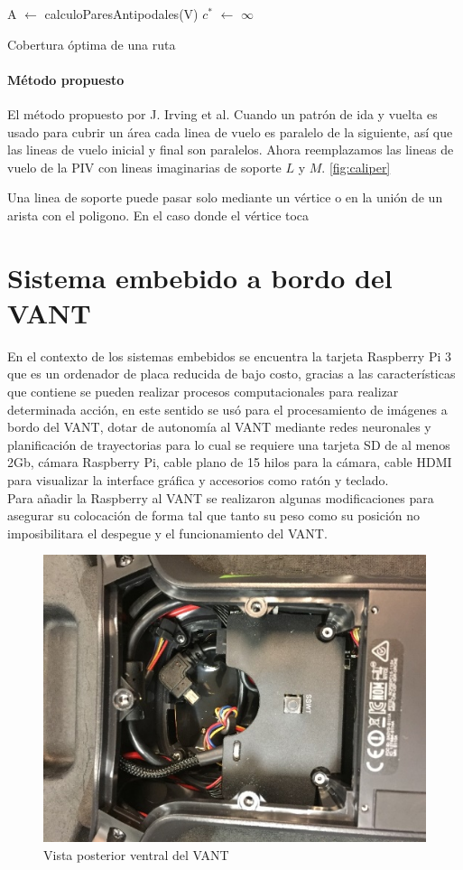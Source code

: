 \documentclass[]{report}
\begin{document}
\begin{algorithm}[H]
	\SetAlgoLined
	\KwResult{$\tau$}
	A $\longleftarrow$ calculoParesAntipodales(V)\;
	$c^*$ $\longleftarrow$ $\infty$\;
	
\caption{Cobertura óptima de una ruta}
\end{algorithm}

\subsubsection{Método propuesto}
 El método propuesto por J. Irving et al. \cite{gomez2017}  
 Cuando un patrón de ida y vuelta es usado para cubrir un área cada linea de vuelo es paralelo de la siguiente, así que las lineas de vuelo inicial y final son paralelos. Ahora reemplazamos las lineas de vuelo de la PIV con lineas imaginarias de soporte $L$ y $M$. \ref*{fig:caliper}

Una linea de soporte puede pasar solo mediante un vértice o en la unión de un arista con el poligono. En el caso donde el vértice toca 
\chapter {Sistema embebido a bordo del VANT}

En el contexto de los sistemas embebidos se encuentra la tarjeta Raspberry Pi 3 que es un ordenador de placa reducida de bajo costo, gracias a las características que contiene se pueden realizar procesos computacionales para realizar determinada acción, en este sentido se usó para el procesamiento de imágenes a bordo del VANT, dotar de autonomía al VANT mediante redes neuronales y planificación de trayectorias para lo cual se requiere una tarjeta SD de al menos 2Gb, cámara Raspberry Pi, cable plano de 15 hilos para la cámara, cable HDMI para visualizar la interface gráfica y accesorios como ratón y teclado.\\
Para añadir la Raspberry al VANT se realizaron algunas modificaciones para asegurar su colocación de forma tal que tanto su peso como su posición no imposibilitara el despegue y el funcionamiento del VANT.
\begin{figure}[!h]
	\centering
	\includegraphics[width=.6\textwidth]{dos}
	\caption{Vista posterior ventral del VANT}
	\label{Vista ven}
\end{figure}
\end{document}

